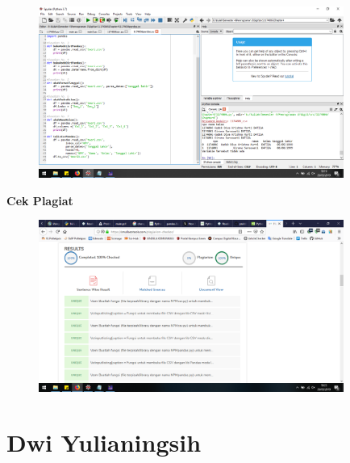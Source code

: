 \begin{figure}[H]
	\includegraphics[width=10cm]{figures/diva/Chapter4/harikedua/k5.png}
	\centering
\end{figure}

\textbf{Cek Plagiat}
\begin{figure}[H]
	\includegraphics[width=10cm]{figures/diva/Chapter4/harikedua/plagiatketrampilan.png}
	\centering
\end{figure}


\section{Dwi Yulianingsih}
